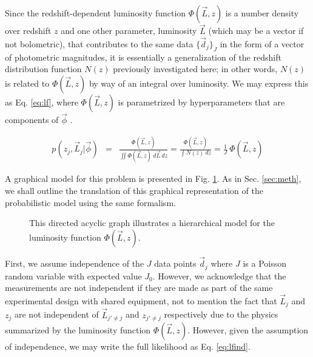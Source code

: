 \documentclass[preprint]{aastex}
\begin{document}
Since the redshift-dependent luminosity function $\Phi(\vec{L},z)$ is a number 
density over redshift $z$ and one other parameter, luminosity $\vec{L}$ (which 
may be a vector if not bolometric), that contributes to the same data 
$\{\vec{d}_{j}\}_{J}$ in the form of a vector of photometric magnitudes, it is 
essentially a generalization of the redshift distribution function $N(z)$ 
previously investigated here; in other words, $N(z)$ is related to 
$\Phi(\vec{L},z)$ by way of an integral over luminosity.   We may express this 
as Eq. \ref{eq:lf}, where $\Phi(\vec{L},z)$ is parametrized by hyperparameters 
that are components of $\vec{\phi}$ .

\begin{eqnarray}
\label{eq:lf}
p(z_{j},\vec{L}_{j}|\vec{\phi}) &=& \frac{\Phi(\vec{L},z)}{\iint 
\Phi(\vec{L},z)\ d\vec{L}\ dz} = \frac{\Phi(\vec{L},z)}{\int N(z)\ dz} = 
\frac{1}{J}\ \Phi(\vec{L},z)
\end{eqnarray}

A graphical model for this problem is presented in Fig. \ref{fig:lf}.  As in 
Sec. \ref{sec:meth}, we shall outline the translation of this graphical 
representation of the probabilistic model using the same formalism.

\begin{figure}
\vspace{0.5cm}
\begin{center}
\caption{This directed acyclic graph illustrates a hierarchical model for the 
luminosity function $\Phi(\vec{L},z)$.}
\label{fig:lf}
\end{center}
\end{figure}

First, we assume independence of the $J$ data points $\vec{d}_{j}$ where $J$ is 
a Poisson random variable with expected value $J_{0}$.  However, we acknowledge 
that the measurements are not independent if they are made as part of the same 
experimental design with shared equipment, not to mention the fact that 
$\vec{L}_{j}$ and $z_{j}$ are not independent of $\vec{L}_{j'\neq j}$ and 
$z_{j'\neq j}$ respectively due to the physics summarized by the luminosity 
function $\Phi(\vec{L},z)$.  However, given the assumption of independence, we 
may write the full likelihood as Eq. \ref{eq:lfind}.  
\end{document}
